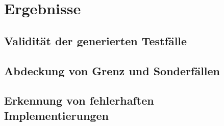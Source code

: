 \section{Ergebnisse}

\subsection{Validität der generierten Testfälle}


\subsection{Abdeckung von Grenz und Sonderfällen}


\subsection{Erkennung von fehlerhaften Implementierungen}

\newpage